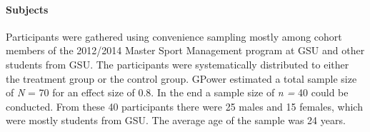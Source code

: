 \documentclass[	
	12pt, %
	a4paper, %
  abstracton
]{scrartcl}\usepackage[]{graphicx}\usepackage[]{color}
\begin{document}

\paragraph{Subjects}
Participants were gathered using convenience sampling mostly among cohort members of the 2012/2014 Master Sport Management program at GSU and other students from GSU. The participants were systematically distributed to either the treatment group or the control group. GPower estimated a total sample size of \textit{N} = 70 for an effect size of 0.8. In the end a sample size of \textit{n =} 40 could be conducted. From these 40 participants there were 25 males and 15 females, which were mostly students from GSU. The average age of the sample was 24 years.
\end{document}

